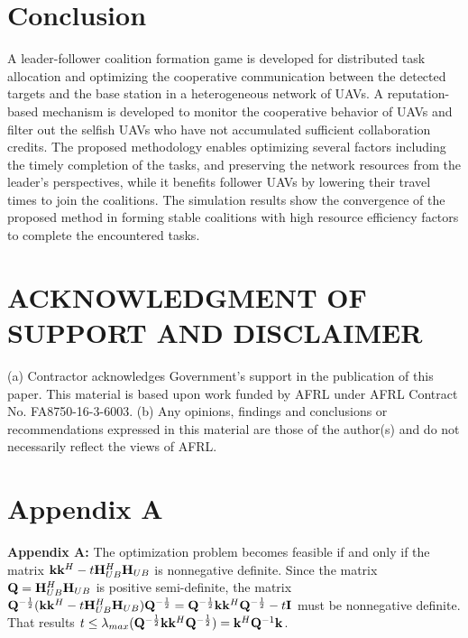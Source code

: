 \documentclass[conference]{IEEEtran}
\theoremstyle{remark}
\theoremstyle{lemma}
\def\bH{{\bf H}}
\def\bQ{{\bf Q}}
\def\bk{{\bf k}}
\begin{document}
\section{Conclusion}\label{sec:Conclusion}
A leader-follower coalition formation game is developed for distributed task allocation and optimizing the cooperative communication between the detected targets and the base station in a heterogeneous network of UAVs. A reputation-based mechanism is developed to monitor the cooperative behavior of UAVs and filter out the selfish UAVs who have not accumulated sufficient collaboration credits. The proposed methodology enables optimizing several factors including the timely completion of the tasks, and preserving the network resources from the leader's perspectives, while it benefits follower UAVs by lowering their travel times to join the coalitions. 
The simulation results show the convergence of the proposed method in forming stable coalitions with high resource efficiency factors to complete the encountered tasks.

\section{ACKNOWLEDGMENT OF SUPPORT AND DISCLAIMER}
(a) Contractor acknowledges Government's support in the publication of this paper. This material is based upon work funded by AFRL under AFRL Contract No. FA8750-16-3-6003. (b) Any opinions, findings and conclusions or recommendations expressed in this material are those of the author(s) and do not necessarily reflect the views of AFRL.

\appendix \label{Appendix:One}
\section{Appendix A}
\textbf{Appendix A:} The optimization problem becomes feasible if and only if the matrix $\bk \bk^H - t\bH_{UB}^H\bH_{UB}$ is nonnegative definite. Since the matrix $\bQ = \bH_{UB}^H\bH_{UB}$ is positive semi-definite, the matrix $\bQ^{-\frac{1}{2}}(\bk \bk^H - t\bH_{UB}^H\bH_{UB})\bQ^{-\frac{1}{2}} = \bQ^{-\frac{1}{2}}\bk \bk^H \bQ^{-\frac{1}{2}} - t \textbf{I}$ must be nonnegative definite. That results $t \leq \lambda_{max}(\bQ^{-\frac{1}{2}}\bk \bk^H \bQ^{-\frac{1}{2}}) = \bk^H \bQ^{-1}\bk $.


\end{document}
